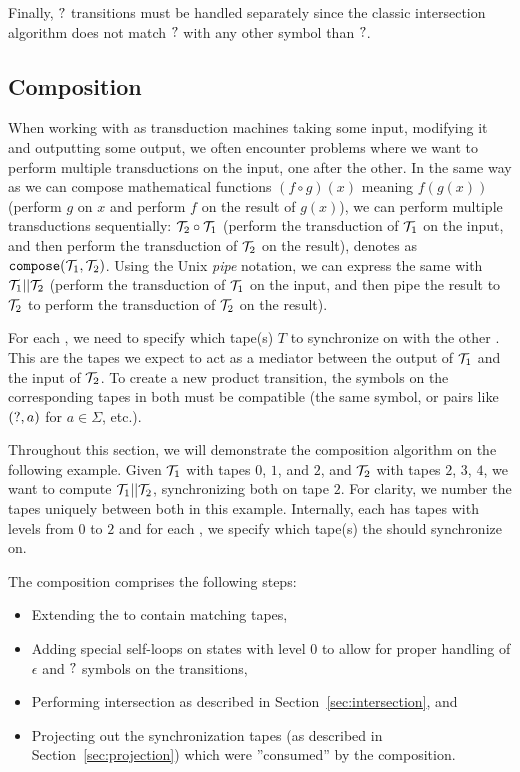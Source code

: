 Finally, $?$ transitions must be handled separately since the classic intersection algorithm does not match $?$ with any other symbol than $?$.

\subsection{Composition}

When working with \nfts as transduction machines taking some input, modifying it and outputting some output, we often encounter problems where we want to perform multiple transductions on the input, one after the other.
In the same way as we can compose mathematical functions $(f \circ g)(x)$ meaning $f(g(x))$ (perform $g$ on $x$ and perform $f$ on the result of $g(x)$),
we can perform multiple \nfts transductions sequentially: $\mathcal{T}_2 \circ \mathcal{T}_1$
(perform the transduction of $\mathcal{T}_1$ on the input, and then perform the transduction of $\mathcal{T}_2$ on the result), denotes as $\texttt{compose}(\mathcal{T}_1, \mathcal{T}_2)$.
Using the Unix \emph{pipe} notation, we can express the same with $\mathcal{T}_1 || \mathcal{T}_2$
(perform the transduction of $\mathcal{T}_1$ on the input, and then pipe the result to $\mathcal{T}_2$ to perform the transduction of $\mathcal{T}_2$ on the result).

For each \nft, we need to specify which tape(s) $T$ to synchronize on with the other \nft.
This are the tapes we expect to act as a mediator between the output of $\mathcal{T}_1$ and the input of $\mathcal{T}_2$.
To create a new product transition, the symbols on the corresponding tapes in both \nfts must be compatible (the same symbol, or pairs like $(?, a)$ for $a \in \Sigma$, etc.).

\begin{example}
  Throughout this section, we will demonstrate the composition algorithm on the following example.
  Given \nft $\mathcal{T}_1$ with tapes $0$, $1$, and $2$, and $\mathcal{T}_2$ with tapes $2$, $3$, $4$, we want to compute $\mathcal{T}_1 || \mathcal{T}_2$, synchronizing both \nfts on tape $2$.
  For clarity, we number the tapes uniquely between both \nfts in this example. Internally, each \nft has tapes with levels from $0$ to $2$ and for each \nft, we specify which tape(s) the \nfts should synchronize on.
\end{example}

The composition comprises the following steps:
\begin{itemize}
  \item Extending the \nfts to contain matching tapes,
  \item Adding special self-loops on states with level $0$ to allow for proper handling of $\epsilon$ and $?$ symbols on the transitions,
  \item Performing \nft intersection as described in Section~\ref{sec:intersection}, and
  \item Projecting out the synchronization tapes (as described in Section~\ref{sec:projection}) which were ''consumed'' by the composition.
\end{itemize}

